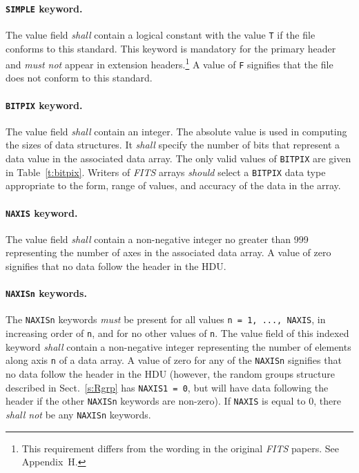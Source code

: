 \documentclass[onecolumn]{aa}
\begin{document}
   \paragraph{{\tt  SIMPLE} keyword.}
 The value field {\em shall} contain a logical constant with the
 value {\tt T} if the file conforms to this standard. 
 This keyword is mandatory for the primary
 header and {\em must not} appear in extension headers.\footnote{This 
   requirement differs from the wording in the original 
{\em FITS\/} papers.  See Appendix~H.}  A value 
 of {\tt F} signifies that the file does not 
 conform to this standard. 
  
   \paragraph{{\tt BITPIX} keyword.}
 The value field {\em shall} contain an integer.  The
 absolute value is used 
 in computing the sizes of data structures.  It {\em shall} specify
 the number of bits that represent a data value in the associated data array. 
 The only valid values 
 of {\tt BITPIX} are given in Table~\ref{t:bitpix}.
Writers of {\em FITS\/} arrays {\em should} select a {\tt BITPIX} data type 
appropriate to the form, range of values, and accuracy of the data in the array.



   \paragraph{{\tt NAXIS} keyword.}
 The value field {\em shall} contain a non-negative integer no greater than
 999 representing the number of axes in the associated data
 array. A value of zero signifies that no data follow the
 header in the HDU.

   \paragraph{{\tt NAXISn} keywords.}
   \label{s:naxisn}
 The {\tt NAXISn} keywords {\em must} be present 
 for all values {\tt n = 1, ..., NAXIS}, in increasing order of {\tt n}, and for 
 no other values of {\tt n}. 
 The value field of this indexed keyword
 {\em shall} contain a non-negative 
 integer representing the number of elements along axis {\tt n} of 
 a data array.  
 A value of zero for any of 
 the {\tt NAXISn} signifies that no data follow the
 header in the HDU
 (however, the random groups structure described in Sect.\ \ref{s:Rgrp} has 
 {\tt NAXIS1 = 0}, but
 will have data following the header if the other {\tt NAXISn} keywords
 are non-zero).
 If {\tt NAXIS} is equal to 0, 
 there {\em shall not} be any {\tt NAXISn} keywords.
  
\end{document}
